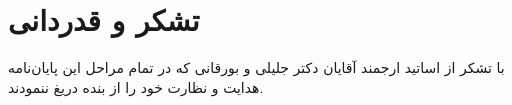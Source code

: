\chapter*{تشکر و قدردانی}
\large
با تشکر از اساتيد ارجمند آقايان دکتر جلیلی و بورقانی که در تمام مراحل اين پايان‌نامه هدايت و نظارت خود را از بنده دريغ ننمودند.
\normalsize

\clearpage